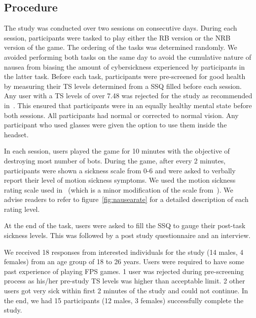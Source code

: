 \documentclass{vgtc}                          %
\begin{document}
\subsection{Procedure}

The study was conducted over two sessions on consecutive days. During each session, participants were tasked to play either the RB version or the NRB version of the game. The ordering of the tasks was determined randomly. We avoided performing both tasks on the same day to avoid the cumulative nature of nausea from biasing the amount of cybersickness experienced by participants in the latter task. Before each task, participants were pre-screened for good health by measuring their TS levels determined from a SSQ filled before each session. Any user with a TS levels of over 7.48 was rejected for the study as recommended in~\cite{lawson2014handbook2}. This ensured that participants were in an equally healthy mental state before both sessions. All participants had normal or corrected to normal vision. Any participant who used glasses were given the option to use them inside the headset.

In each session, users played the game for 10 minutes with the objective of destroying most number of bots. During the game, after every 2 minutes, participants were shown a sickness scale from 0-6 and were asked to verbally report their level of motion sickness symptoms. We used the motion sickness rating scale used in~\cite{griffin2004visual} (which is a minor modification of the scale from~\cite{golding1992comparison}). We advise readers to refer to figure~\ref{fig:nausearate} for a detailed description of each rating level.

At the end of the task, users were asked to fill the SSQ to gauge their post-task sickness levels. This was followed by a post study questionnaire and an interview. 

We received 18 responses from interested individuals for the study (14 males, 4 females) from an age group of 18 to 26 years. Users were required to have some past experience of playing FPS games. 1 user was rejected during pre-screening process as his/her pre-study TS levels was higher than acceptable limit. 2 other users got very sick within first 2 minutes of the study and could not continue. In the end, we had 15 participants (12 males, 3 females) successfully complete the study.
\end{document}
